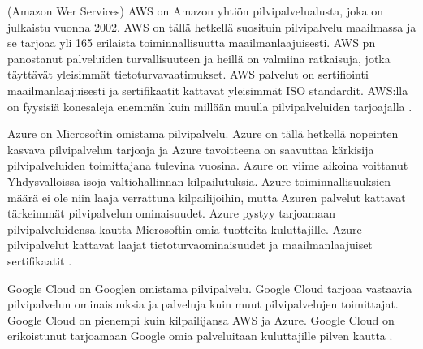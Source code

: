(Amazon Wer Services) AWS on Amazon yhtiön pilvipalvelualusta, joka on julkaistu vuonna 2002. AWS on tällä hetkellä suosituin pilvipalvelu maailmassa ja se tarjoaa yli 165 erilaista toiminnallisuutta maailmanlaajuisesti. AWS pn panostanut palveluiden turvallisuuteen ja heillä on valmiina ratkaisuja, jotka täyttävät yleisimmät tietoturvavaatimukset. AWS palvelut on sertifiointi maailmanlaajuisesti ja sertifikaatit kattavat yleisimmät ISO standardit. AWS:lla on fyysisiä konesaleja enemmän kuin millään muulla pilvipalveluiden tarjoajalla \citep{top_cloud}.

Azure on Microsoftin omistama pilvipalvelu. Azure on tällä hetkellä nopeinten kasvava pilvipalvelun tarjoaja ja Azure tavoitteena on saavuttaa kärkisija pilvipalveluiden toimittajana tulevina vuosina. Azure on viime aikoina voittanut Yhdysvalloissa isoja valtiohallinnan kilpailutuksia. Azure toiminnallisuuksien määrä ei ole niin laaja verrattuna kilpailijoihin, mutta Azuren palvelut kattavat tärkeimmät pilvipalvelun ominaisuudet. Azure pystyy tarjoamaan pilvipalveluidensa kautta Microsoftin omia tuotteita kuluttajille. Azure pilvipalvelut kattavat laajat tietoturvaominaisuudet ja maailmanlaajuiset sertifikaatit \citep{top_cloud}.

Google Cloud on Googlen omistama pilvipalvelu. Google Cloud tarjoaa vastaavia pilvipalvelun ominaisuuksia ja palveluja kuin muut pilvipalvelujen toimittajat. Google Cloud on pienempi kuin kilpailijansa AWS ja Azure. Google Cloud on erikoistunut tarjoamaan Google omia palveluitaan kuluttajille pilven kautta \citep{top_cloud}.
